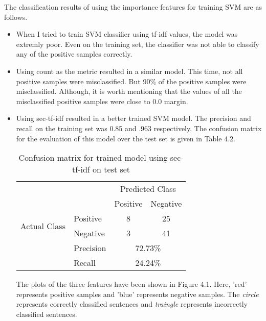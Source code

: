 The classification results of using the importance features for training SVM are as follows.
\begin{itemize}
\item When I tried to train SVM classifier using tf-idf values, the model was extremly poor.
Even on the training set, the classifier was not able to classify any of the positive samples correctly.
\item Using count as the metric resulted in a similar model.
This time, not all positive samples were misclassified. But 90\% of the positive samples were misclassified.
Although, it is worth mentioning that the values of all the misclassified positive samples were close to 0.0 margin.
\item Using sec-tf-idf resulted in a better trained SVM model.
The precision and recall on the training set was 0.85 and .963 respectively.
The confusion matrix for the evaluation of this model over the test set is given in Table 4.2.
\begin{table}[h]
\centering
\caption{Confusion matrix for trained model using sec-tf-idf on test set}
\begin{tabular}{ll|c|c|}
                              &                                & \multicolumn{2}{c}{Predicted Class}                            \\ \cline{3-4} 
                              &                                & \multicolumn{1}{|l}{Positive} & \multicolumn{1}{|l|}{Negative} \\ \cline{2-4} 
\multirow{2}{*}{Actual Class} & \multicolumn{1}{|l|}{Positive} & 8                             & 25                             \\ \cline{2-4} 
                              & \multicolumn{1}{|l|}{Negative} & 3                             & 41                             \\ \cline{2-4} 
                              & \multicolumn{1}{|l}{Precision} & \multicolumn{2}{|c|}{72.73\%}                                  \\ \cline{2-4} 
                              & \multicolumn{1}{|l}{Recall}    & \multicolumn{2}{|c|}{24.24\%}                                  \\ \cline{2-4} 
\end{tabular}
\end{table}

The plots of the three features have been shown in Figure 4.1.
Here, 'red' represents positive samples and 'blue' represents negative samples.
The \textit{circle} represents correctly classified sentences and \textit{traingle} represents incorrectly classified sentences.


\end{itemize}
